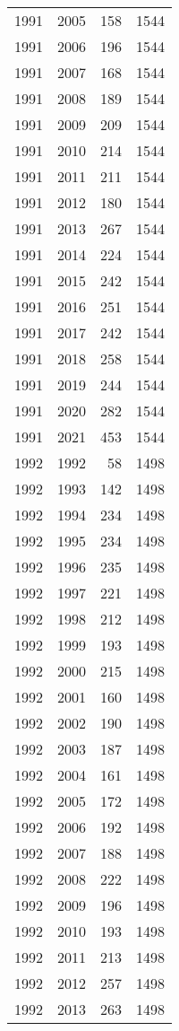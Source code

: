\documentclass[
  10pt,
  letterpaper,
  DIV=11,
  numbers=noendperiod,
  twoside]{scrartcl}
\begin{document}
\begin{longtable}[]{@{}rrrr@{}}
1991 & 2005 & 158 & 1544 \\
1991 & 2006 & 196 & 1544 \\
1991 & 2007 & 168 & 1544 \\
1991 & 2008 & 189 & 1544 \\
1991 & 2009 & 209 & 1544 \\
1991 & 2010 & 214 & 1544 \\
1991 & 2011 & 211 & 1544 \\
1991 & 2012 & 180 & 1544 \\
1991 & 2013 & 267 & 1544 \\
1991 & 2014 & 224 & 1544 \\
1991 & 2015 & 242 & 1544 \\
1991 & 2016 & 251 & 1544 \\
1991 & 2017 & 242 & 1544 \\
1991 & 2018 & 258 & 1544 \\
1991 & 2019 & 244 & 1544 \\
1991 & 2020 & 282 & 1544 \\
1991 & 2021 & 453 & 1544 \\
1992 & 1992 & 58 & 1498 \\
1992 & 1993 & 142 & 1498 \\
1992 & 1994 & 234 & 1498 \\
1992 & 1995 & 234 & 1498 \\
1992 & 1996 & 235 & 1498 \\
1992 & 1997 & 221 & 1498 \\
1992 & 1998 & 212 & 1498 \\
1992 & 1999 & 193 & 1498 \\
1992 & 2000 & 215 & 1498 \\
1992 & 2001 & 160 & 1498 \\
1992 & 2002 & 190 & 1498 \\
1992 & 2003 & 187 & 1498 \\
1992 & 2004 & 161 & 1498 \\
1992 & 2005 & 172 & 1498 \\
1992 & 2006 & 192 & 1498 \\
1992 & 2007 & 188 & 1498 \\
1992 & 2008 & 222 & 1498 \\
1992 & 2009 & 196 & 1498 \\
1992 & 2010 & 193 & 1498 \\
1992 & 2011 & 213 & 1498 \\
1992 & 2012 & 257 & 1498 \\
1992 & 2013 & 263 & 1498 \\

\end{longtable}
\end{document}
